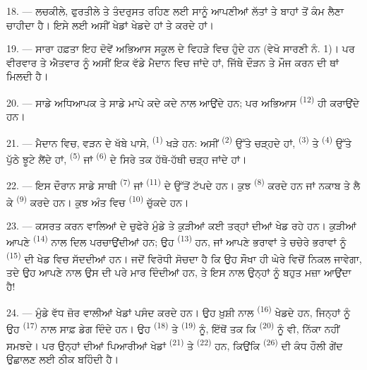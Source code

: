 18. --- ਲਚਕੀਲੇ, ਫੁਰਤੀਲੇ ਤੇ ਤੰਦਰੁਸਤ ਰਹਿਣ ਲਈ ਸਾਨੂੰ ਆਪਣੀਆਂ ਲੱਤਾਂ ਤੇ ਬਾਹਾਂ ਤੋਂ
ਕੰਮ ਲੈਣਾ ਚਾਹੀਦਾ ਹੈ। ਇਸੇ ਲਈ ਅਸੀਂ ਖੇਡਾਂ ਖੇਡਦੇ ਹਾਂ ਤੇ  ਕਰਦੇ ਹਾਂ।

19. --- ਸਾਰਾ ਹਫ਼ਤਾ ਇਹ ਦੋਵੇਂ ਅਭਿਆਸ ਸਕੂਲ ਦੇ ਵਿਹੜੇ ਵਿਚ ਹੁੰਦੇ ਹਨ (ਵੇਖੋ ਸਾਰਣੀ ਨੰ.
1)। ਪਰ ਵੀਰਵਾਰ ਤੇ ਐਤਵਾਰ ਨੂੰ ਅਸੀਂ ਇਕ ਵੱਡੇ ਮੈਦਾਨ ਵਿਚ ਜਾਂਦੇ ਹਾਂ, ਜਿੱਥੇ ਦੌੜਨ ਤੇ
ਮੌਜ ਕਰਨ ਦੀ ਥਾਂ ਮਿਲਦੀ ਹੈ।

20. --- ਸਾਡੇ ਅਧਿਆਪਕ ਤੇ ਸਾਡੇ ਮਾਪੇ ਕਦੇ ਕਦੇ ਨਾਲ ਆਉਂਦੇ ਹਨ; ਪਰ ਅਭਿਆਸ
 \textsuperscript{(12)} ਹੀ ਕਰਾਉਂਦੇ ਹਨ।

21. --- ਮੈਦਾਨ ਵਿਚ, ਵੜਨ ਦੇ ਖੱਬੇ ਪਾਸੇ, 
\textsuperscript{(1)} ਖੜੇ ਹਨ: ਅਸੀਂ  \textsuperscript{(2)} ਉੱਤੇ
ਚੜ੍ਹਦੇ ਹਾਂ,  \textsuperscript{(3)} ਤੇ 
\textsuperscript{(4)} ਉੱਤੇ ਪੁੱਠੇ ਝੂਟੇ ਲੈਂਦੇ ਹਾਂ, 
\textsuperscript{(5)} ਜਾਂ  \textsuperscript{(6)} ਦੇ ਸਿਰੇ
ਤਕ ਹੱਥੋ-ਹੱਥੀ ਚੜ੍ਹ ਜਾਂਦੇ ਹਾਂ।

22. --- ਇਸ ਦੌਰਾਨ ਸਾਡੇ ਸਾਥੀ  \textsuperscript{(7)} ਜਾਂ
 \textsuperscript{(11)} ਦੇ ਉੱਤੋਂ ਟੱਪਦੇ ਹਨ। ਕੁਝ
 \textsuperscript{(8)} ਕਰਦੇ ਹਨ ਜਾਂ ਨਕਾਬ ਤੇ 
ਲੈ ਕੇ  \textsuperscript{(9)} ਕਰਦੇ ਹਨ। ਕੁਝ ਅੰਤ ਵਿਚ
 \textsuperscript{(10)} ਚੁੱਕਦੇ ਹਨ।

\VUsaut{4.6mm}
\VUsaut{3.0mm}

23. --- ਕਸਰਤ ਕਰਨ ਵਾਲਿਆਂ ਦੇ ਚੁਫੇਰੇ ਮੁੰਡੇ ਤੇ ਕੁੜੀਆਂ ਕਈ ਤਰ੍ਹਾਂ ਦੀਆਂ
 ਖੇਡ ਰਹੇ ਹਨ। ਕੁੜੀਆਂ ਆਪਣੇ  \textsuperscript{(14)} ਨਾਲ
ਦਿਲ ਪਰਚਾਉਂਦੀਆਂ ਹਨ; ਉਹ  \textsuperscript{(13)} ਹਨ, ਜਾਂ ਆਪਣੇ
ਭਰਾਵਾਂ ਤੇ ਚਚੇਰੇ ਭਰਾਵਾਂ ਨੂੰ  \textsuperscript{(15)} ਦੀ ਖੇਡ ਵਿਚ
ਸੱਦਦੀਆਂ ਹਨ। ਜਦੋਂ ਵਿਰੋਧੀ ਸੋਚਦਾ ਹੈ ਕਿ ਉਹ ਸੌਖਾ ਹੀ ਘੇਰੇ ਵਿਚੋਂ ਨਿਕਲ ਜਾਵੇਗਾ, ਤਦੇ
ਉਹ ਆਪਣੇ  ਨਾਲ ਉਸ ਦੀ  ਪਰੇ ਮਾਰ ਦਿੰਦੀਆਂ ਹਨ,
ਤੇ ਇਸ ਨਾਲ ਉਨ੍ਹਾਂ ਨੂੰ ਬਹੁਤ ਮਜ਼ਾ ਆਉਂਦਾ ਹੈ!

24. --- ਮੁੰਡੇ ਵੱਧ ਜ਼ੋਰ ਵਾਲੀਆਂ ਖੇਡਾਂ ਪਸੰਦ ਕਰਦੇ ਹਨ। ਉਹ ਖ਼ੁਸ਼ੀ ਨਾਲ
 \textsuperscript{(16)} ਖੇਡਦੇ ਹਨ, ਜਿਨ੍ਹਾਂ ਨੂੰ ਉਹ
 \textsuperscript{(17)} ਨਾਲ ਸਾਫ਼ ਡੇਗ ਦਿੰਦੇ ਹਨ। ਉਹ 
\textsuperscript{(18)} ਤੇ  \textsuperscript{(19)} ਨੂੰ, ਇੱਥੋਂ ਤਕ
ਕਿ  \textsuperscript{(20)} ਨੂੰ ਵੀ, ਨਿੱਕਾ ਨਹੀਂ ਸਮਝਦੇ। ਪਰ
ਉਨ੍ਹਾਂ ਦੀਆਂ ਪਿਆਰੀਆਂ ਖੇਡਾਂ  \textsuperscript{(21)} ਤੇ
 \textsuperscript{(22)} ਹਨ, ਕਿਉਂਕਿ 
\textsuperscript{(26)} ਦੀ ਕੰਧ ਹੌਲੀ ਗੇਂਦ ਉਛਾਲਣ ਲਈ ਠੀਕ ਬਹਿੰਦੀ ਹੈ।

